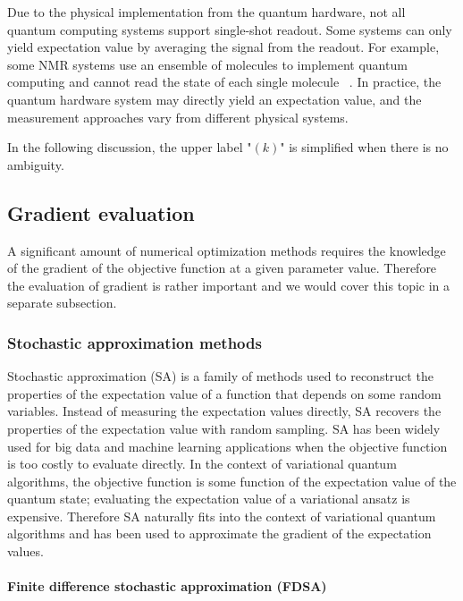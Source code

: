 Due to the physical implementation from the quantum hardware, not all quantum computing systems support single-shot readout. Some systems can only yield expectation value by averaging the signal from the readout. For example, some NMR systems use an ensemble of molecules to implement quantum computing and cannot read the state of each single molecule~ \cite{ebel_dispersive_2021,lu_nmr_2015}. In practice, the quantum hardware system may directly yield an expectation value, and the measurement approaches vary from different physical systems.  

In the following discussion, the upper label "$(k)$" is simplified when there is no ambiguity.

\subsection{Gradient evaluation}

A significant amount of numerical optimization methods requires the knowledge of the gradient of the objective function at a given parameter value. Therefore the evaluation of gradient is rather important and we would cover this topic in a separate subsection. %

\subsubsection{Stochastic approximation methods }\label{sec:stochastic_approximation}

Stochastic approximation (SA) is a family of methods used to reconstruct the properties of the expectation value of a function that depends on some random variables. Instead of measuring the expectation values directly, SA recovers the properties of the expectation value with random sampling. SA has been widely used for big data and machine learning applications when the objective function is too costly to evaluate directly. In the context of variational quantum algorithms, the objective function is some function of the expectation value of the quantum state; evaluating the expectation value of a variational ansatz is expensive. Therefore SA naturally fits into the context of variational quantum algorithms and has been used to approximate the gradient of the expectation values.      

\paragraph{Finite difference stochastic approximation (FDSA)}

